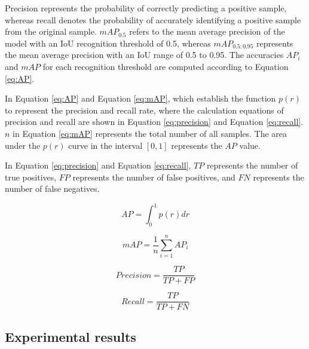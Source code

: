 \documentclass[aic]{iosart2x}
\begin{document}
Precision represents the probability of correctly predicting a positive sample, whereas recall denotes the probability of accurately identifying a positive sample from the original sample. $mAP_{0.5}$ refers to the mean average precision of the model with an IoU recognition threshold of 0.5, whereas $mAP_{0.5:0.95}$ represents the mean average precision with an IoU range of 0.5 to 0.95. The accuracies $AP_i$ and $mAP$ for each recognition threshold are computed according to Equation \ref{eq:AP}.

In Equation \ref{eq:AP} and Equation \ref{eq:mAP}, which establish the function $p(r)$ to represent the precision and recall rate, where the calculation equations of precision and recall are shown in Equation \ref{eq:precision} and Equation \ref{eq:recall}. $n$ in Equation \ref{eq:mAP} represents the total number of all samples. The area under the $p(r)$ curve in the interval $[0,1]$ represents the $AP$ value.


In Equation \ref{eq:precision} and Equation \ref{eq:recall}, $TP$ represents the number of true positives, $FP$ represents the number of false positives, and $FN$ represents the number of false negatives.

\begin{equation}
 AP = \int_{0}^{1} p(r)dr \label{eq:AP}
\end{equation}

\begin{equation}
 mAP = \frac{1}{n} \sum_{i=1}^{n} AP_i \label{eq:mAP}
\end{equation}

\begin{equation}
 Precision = \frac{TP}{TP + FP} \label{eq:precision}
\end{equation}

\begin{equation}
 Recall = \frac{TP}{TP + FN} \label{eq:recall}
\end{equation}

\subsection{Experimental results}
\end{document}
